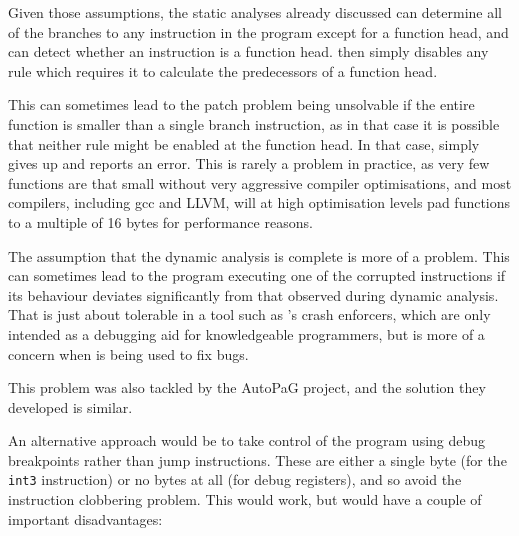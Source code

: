 Given those assumptions, the static analyses already discussed can
determine all of the branches to any instruction in the program except
for a function head, and can detect whether an instruction is a
function head.  {\Technique} then simply disables any rule which
requires it to calculate the predecessors of a function head.

This can sometimes lead to the patch problem being unsolvable if the
entire function is smaller than a single branch instruction, as in
that case it is possible that neither rule might be enabled at the
function head.  In that case, {\technique} simply gives up and reports
an error.  This is rarely a problem in practice, as very few functions
are that small without very aggressive compiler optimisations, and
most compilers, including gcc and LLVM\needCite{}, will at high
optimisation levels pad functions to a multiple of 16 bytes for
performance reasons.

The assumption that the dynamic analysis is complete is more of a
problem.  This can sometimes lead to the program executing one of the
corrupted instructions if its behaviour deviates significantly from
that observed during dynamic analysis.  That is just about tolerable
in a tool such as {\technique}'s crash enforcers, which are only
intended as a debugging aid for knowledgeable programmers, but is more
of a concern when {\technique} is being used to fix bugs. 

This problem was also tackled by the AutoPaG project, and the solution
they developed is similar. 

An alternative approach would be to take control of the program using
debug breakpoints rather than jump instructions.  These are either a
single byte (for the \verb|int3| instruction) or no bytes at all (for
debug registers), and so avoid the instruction clobbering problem.
This would work, but would have a couple of important disadvantages:

